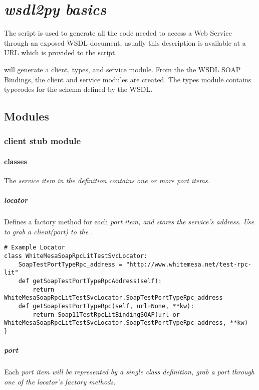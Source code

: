 \chapter{\it{wsdl2py} basics}

The \WPY script is used to generate all the code needed to access a Web Service
through an exposed WSDL document, usually this description is available at a URL
which is provided to the script. 

\WPY will generate a client, types, and service module.   From the the WSDL
SOAP Bindings, the client and service modules are created.  The types module
contains typecodes for the schema defined by the WSDL.

\section{Modules}
\label{subsection: Modules}

\subsection{client stub module}

\subsubsection{classes}
The \it{service item} in the \WSDL definition contains one or more \it{port 
items}.

\paragraph{locator}
Defines a factory method for each \it{port item}, and stores the service's
address.  Use to grab a client(port) to the \WS.

\begin{verbatim}
# Example Locator
class WhiteMesaSoapRpcLitTestSvcLocator:
    SoapTestPortTypeRpc_address = "http://www.whitemesa.net/test-rpc-lit"
    def getSoapTestPortTypeRpcAddress(self):
        return WhiteMesaSoapRpcLitTestSvcLocator.SoapTestPortTypeRpc_address
    def getSoapTestPortTypeRpc(self, url=None, **kw):
        return Soap11TestRpcLitBindingSOAP(url or WhiteMesaSoapRpcLitTestSvcLocator.SoapTestPortTypeRpc_address, **kw)
}
\end{verbatim}

\paragraph{port}
Each \it{port item} will be represented by a single class definition, grab a
port through one of the locator's factory methods.

